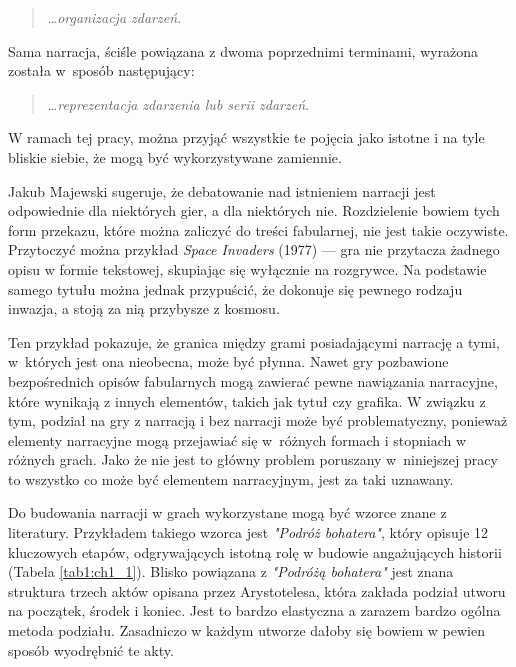 \begin{quotation}
    \ldots \textit{organizacja zdarzeń.}\cite{narrative_structures}
\end{quotation}

Sama narracja, ściśle powiązana z dwoma poprzednimi terminami, wyrażona została w~sposób
następujący:

\begin{quotation}
    \ldots \textit{reprezentacja zdarzenia lub serii zdarzeń.}\cite{narrative_structures}
\end{quotation}

W ramach tej pracy, można przyjąć wszystkie te pojęcia jako istotne i na tyle bliskie
siebie, że mogą być wykorzystywane zamiennie.

Jakub Majewski sugeruje, że debatowanie nad istnieniem narracji jest odpowiednie dla niektórych
gier, a dla niektórych nie\cite{theorising_narrative}. Rozdzielenie bowiem tych form
przekazu, które można zaliczyć do treści fabularnej, nie jest takie oczywiste. Przytoczyć można
przykład \textit{Space Invaders} (1977) --- gra nie przytacza żadnego opisu w formie tekstowej,
skupiając się wyłącznie na rozgrywce. Na podstawie samego tytułu można jednak
przypuścić, że dokonuje się pewnego rodzaju inwazja, a stoją za nią przybysze z kosmosu\cite{theorising_narrative}.

Ten przykład pokazuje, że granica między grami posiadającymi narrację a tymi, w~których jest ona nieobecna,
może być płynna. Nawet gry pozbawione bezpośrednich opisów fabularnych mogą zawierać pewne nawiązania narracyjne,
które wynikają z innych elementów, takich jak tytuł czy grafika. W związku z tym, podział na gry z narracją i bez
narracji może być problematyczny, ponieważ elementy narracyjne mogą przejawiać się w~różnych formach i stopniach
w różnych grach. Jako że nie jest to główny problem poruszany w~niniejszej pracy to wszystko co może być elementem
narracyjnym, jest za taki uznawany.

Do budowania narracji w grach wykorzystane mogą być wzorce znane z literatury. Przykładem takiego wzorca jest
\textit{"Podróż bohatera"}\cite{narrative_structures}, który opisuje 12 kluczowych etapów, odgrywających
istotną rolę w budowie angażujących historii (Tabela \ref{tab1:ch1_1}). Blisko powiązana z \textit{"Podróżą bohatera"}
jest znana struktura trzech aktów opisana przez Arystotelesa, która zakłada podział utworu na
początek, środek i koniec\cite{narrative_structures}. Jest to bardzo elastyczna a zarazem bardzo ogólna metoda
podziału. Zasadniczo w każdym utworze dałoby się bowiem w pewien sposób wyodrębnić te akty.


